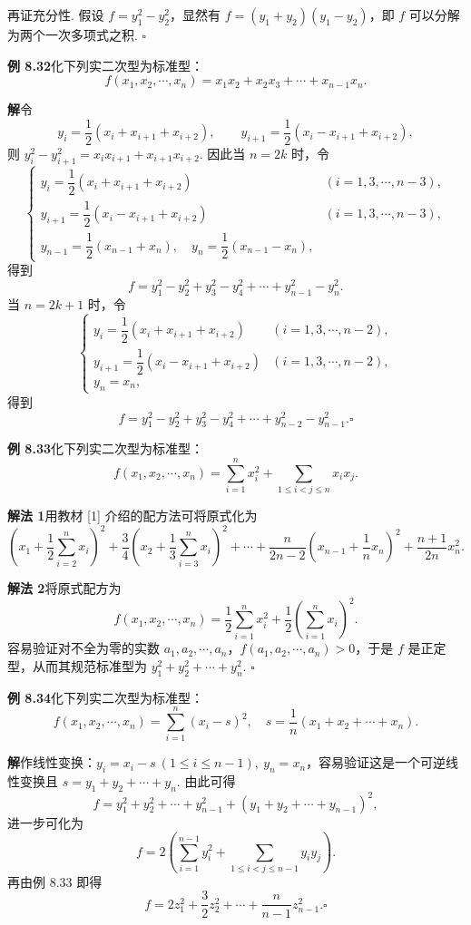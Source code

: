 \documentclass[UTF8, 12pt, fontset=fandol, oneside]{ctexart}
\begin{document}
再证充分性. 假设 $f=y_1^2-y_2^2$，显然有 $f=(y_1+y_2)(y_1-y_2)$，即 $f$ 可以分解为两个一次多项式之积. $\ensuremath{\square}$

\noindent\textbf{例 8.32}\quad 化下列实二次型为标准型：
\[
f(x_1,x_2,\cdots,x_n)=x_1x_2+x_2x_3+\cdots+x_{n-1}x_n.
\]

\noindent\textbf{解}\quad 令
\[
y_i=\frac12(x_i+x_{i+1}+x_{i+2}),\qquad
y_{i+1}=\frac12(x_i-x_{i+1}+x_{i+2}),
\]
则 $y_i^2-y_{i+1}^2=x_ix_{i+1}+x_{i+1}x_{i+2}$. 因此当 $n=2k$ 时，令
\[
\left\{\begin{array}{ll}
y_i=\dfrac12(x_i+x_{i+1}+x_{i+2}) &(i=1,3,\cdots,n-3),\\
y_{i+1}=\dfrac12(x_i-x_{i+1}+x_{i+2}) &(i=1,3,\cdots,n-3),\\
y_{n-1}=\dfrac12(x_{n-1}+x_n),\quad y_n=\dfrac12(x_{n-1}-x_n),
\end{array}\right.
\]
得到
\[
f=y_1^2-y_2^2+y_3^2-y_4^2+\cdots+y_{n-1}^2-y_n^2.
\]
当 $n=2k+1$ 时，令
\[
\left\{\begin{array}{ll}
y_i=\dfrac12(x_i+x_{i+1}+x_{i+2}) &(i=1,3,\cdots,n-2),\\
y_{i+1}=\dfrac12(x_i-x_{i+1}+x_{i+2}) &(i=1,3,\cdots,n-2),\\
y_n=x_n,
\end{array}\right.
\]
得到
\[
f=y_1^2-y_2^2+y_3^2-y_4^2+\cdots+y_{n-2}^2-y_{n-1}^2. \ensuremath{\square}
\]

\noindent\textbf{例 8.33}\quad 化下列实二次型为标准型：
\[
f(x_1,x_2,\cdots,x_n)=\sum_{i=1}^n x_i^2+\sum_{1\le i<j\le n}x_ix_j.
\]

\noindent\textbf{解法 1}\quad 用教材 [1] 介绍的配方法可将原式化为
\[
\left(x_1+\frac12\sum_{i=2}^n x_i\right)^2
+\frac34\left(x_2+\frac13\sum_{i=3}^n x_i\right)^2+\cdots
+\frac{n}{2n-2}\left(x_{n-1}+\frac1n x_n\right)^2+\frac{n+1}{2n}x_n^2.
\]

\noindent\textbf{解法 2}\quad 将原式配方为
\[
f(x_1,x_2,\cdots,x_n)=\frac12\sum_{i=1}^n x_i^2+\frac12\left(\sum_{i=1}^n x_i\right)^2.
\]
容易验证对不全为零的实数 $a_1,a_2,\cdots,a_n$，$f(a_1,a_2,\cdots,a_n)>0$，于是 $f$ 是正定型，从而其规范标准型为 $y_1^2+y_2^2+\cdots+y_n^2$. $\ensuremath{\square}$

\noindent\textbf{例 8.34}\quad 化下列实二次型为标准型：
\[
f(x_1,x_2,\cdots,x_n)=\sum_{i=1}^n(x_i-s)^2,\quad s=\frac1n(x_1+x_2+\cdots+x_n).
\]

\noindent\textbf{解}\quad 作线性变换：$y_i=x_i-s\ (1\le i\le n-1),\ y_n=x_n$，容易验证这是一个可逆线性变换且 $s=y_1+y_2+\cdots+y_n$. 由此可得
\[
f=y_1^2+y_2^2+\cdots+y_{n-1}^2+(y_1+y_2+\cdots+y_{n-1})^2,
\]
进一步可化为
\[
f=2\left(\sum_{i=1}^{n-1}y_i^2+\sum_{1\le i<j\le n-1}y_iy_j\right).
\]
再由例 8.33 即得
\[
f=2z_1^2+\frac32z_2^2+\cdots+\frac{n}{n-1}z_{n-1}^2. \ensuremath{\square}
\]
\end{document}
